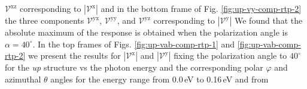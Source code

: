 \documentclass[prb,11pt,tightenlines,twocolumn,aps]{revtex4-1}
\begin{document}
$\mathcal{V}^{\mathrm{xz}}$ corresponding to $|\mathcal{V}^{\mathrm{x}}|$ and in
the bottom frame of Fig. \ref{fig:up-vy-comp-rtp-2} the three components $\mathcal{V}^{\mathrm{yx}}$, $\mathcal{V}^{\mathrm{yy}}$, and $\mathcal{V}^{\mathrm{yz}}$ corresponding to $|\mathcal{V}^{\mathrm{y}}|$
We found that the absolute maximum of the response is obtained when the
polarization angle is $\alpha = 40^{\circ}$. In the top frames of Figs. 
% 
\ref{fig:up-vab-comp-rtp-1}  and \ref{fig:up-vab-comp-rtp-2} we present the
results for $|\mathcal{V}^{\mathrm{x}}|$ and $|\mathcal{V}^{\mathrm{y}}|$ fixing
the polarization angle to $40^{\circ}$ for the \emph{up} structure vs the photon
energy and the corresponding polar $\varphi$ and azimuthal $\theta$ angles for
the energy range from 0.0\,eV to 0.16\,eV and from 





\end{document}
